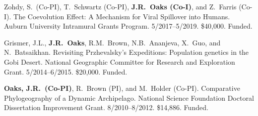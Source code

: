 \myHangIndent
Zohdy, S.\ (Co-PI), T.\ Schwartz (Co-PI), \textbf{J.R.\ Oaks (Co-I)}, and Z.\ Farris (Co-I).
The Coevolution Effect: A Mechanism for Viral Spillover into Humans.
Auburn University Intramural Grants Program.
5/2017--5/2019.
\$40,000.
Funded.

\myHangIndent
Grismer, J.L., \textbf{J.R.\ Oaks}, R.M.\ Brown, N.B.\ Ananjeva, X.\ Guo, and N.\
Batsaikhan.
Revisiting Przhevalsky's Expeditions: Population genetics in the Gobi Desert.
National Geographic Committee for Research and Exploration Grant.
5/2014--6/2015.
\$20,000.
Funded.

\myHangIndent
\textbf{Oaks, J.R.\ (Co-PI)}, R.\ Brown (PI), and M.\ Holder (Co-PI).
Comparative Phylogeography of a Dynamic Archipelago.
National Science Foundation Doctoral Dissertation Improvement Grant.
8/2010--8/2012.
\$14,886.
Funded.

